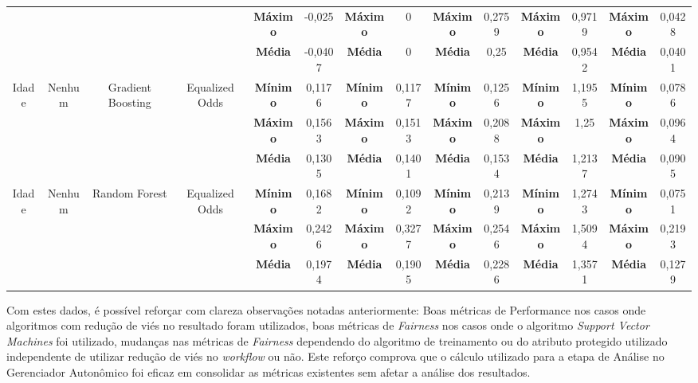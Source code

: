 \documentclass[portugues]{ic-tese}
\begin{document}
\begin{table}[H]
\begin{center}
{\begin{tabular}{c|c|c|c|c|c|c|c|c|c|c|c|c|c}
             & & & & \textbf{Máximo} & -0,025 & \textbf{Máximo} & 0 & \textbf{Máximo} & 0,2759 & \textbf{Máximo} & 0,9719 & \textbf{Máximo} & 0,0428 \\
             & & & & \textbf{Média} & -0,0407 & \textbf{Média} & 0 & \textbf{Média} & 0,25 & \textbf{Média} & 0,9542 & \textbf{Média} & 0,0401 \\
            \hline
            \multirow{3}{*}{Idade} & \multirow{3}{*}{Nenhum} & \multirow{3}{*}{Gradient Boosting} & \multirow{3}{*}{Equalized Odds} & \textbf{Mínimo} & 0,1176 & \textbf{Mínimo} & 0,1177 & \textbf{Mínimo} & 0,1256 & \textbf{Mínimo} & 1,1955 & \textbf{Mínimo} & 0,0786 \\
             & & & & \textbf{Máximo} & 0,1563 & \textbf{Máximo} & 0,1513 & \textbf{Máximo} & 0,2088 & \textbf{Máximo} & 1,25 & \textbf{Máximo} & 0,0964 \\
             & & & & \textbf{Média} & 0,1305 & \textbf{Média} & 0,1401 & \textbf{Média} & 0,1534 & \textbf{Média} & 1,2137 & \textbf{Média} & 0,0905 \\
            \hline
            \multirow{3}{*}{Idade} & \multirow{3}{*}{Nenhum} & \multirow{3}{*}{Random Forest} & \multirow{3}{*}{Equalized Odds} & \textbf{Mínimo} & 0,1682 & \textbf{Mínimo} & 0,1092 & \textbf{Mínimo} & 0,2139 & \textbf{Mínimo} & 1,2743 & \textbf{Mínimo} & 0,0751 \\
             & & & & \textbf{Máximo} & 0,2426 & \textbf{Máximo} & 0,3277 & \textbf{Máximo} & 0,2546 & \textbf{Máximo} & 1,5094 & \textbf{Máximo} & 0,2193 \\
             & & & & \textbf{Média} & 0,1974 & \textbf{Média} & 0,1905 & \textbf{Média} & 0,2286 & \textbf{Média} & 1,3571 & \textbf{Média} & 0,1279 \\
            \end{tabular}}
        \end{center}
    \end{table}

Com estes dados, é possível reforçar com clareza observações notadas anteriormente: Boas métricas de Performance nos casos onde algoritmos com redução de viés no resultado foram utilizados, boas métricas de \textit{Fairness} nos casos onde o algoritmo \textit{Support Vector Machines} foi utilizado, mudanças nas métricas de \textit{Fairness} dependendo do algoritmo de treinamento ou do atributo protegido utilizado independente de utilizar redução de viés no \textit{workflow} ou não. Este reforço comprova que o cálculo utilizado para a etapa de Análise no Gerenciador Autonômico foi eficaz em consolidar as métricas existentes sem afetar a análise dos resultados.
\end{document}
